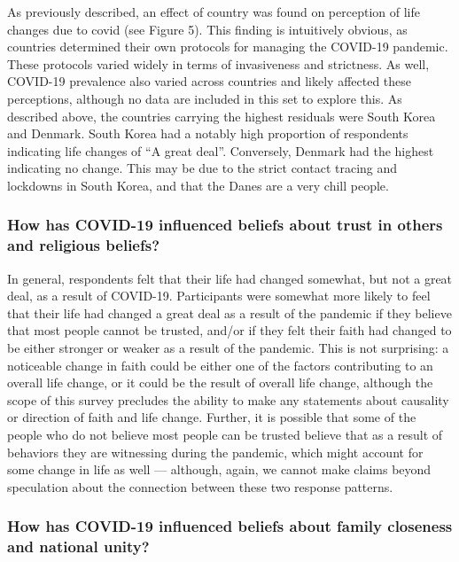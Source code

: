 \documentclass[
  english,
  man]{apa6}
\begin{document}
As previously described, an effect of country was found on perception of life changes due to covid (see Figure 5). This finding is intuitively obvious, as countries determined their own protocols for managing the COVID-19 pandemic. These protocols varied widely in terms of invasiveness and strictness. As well, COVID-19 prevalence also varied across countries and likely affected these perceptions, although no data are included in this set to explore this. As described above, the countries carrying the highest residuals were South Korea and Denmark. South Korea had a notably high proportion of respondents indicating life changes of \enquote{A great deal}. Conversely, Denmark had the highest indicating no change. This may be due to the strict contact tracing and lockdowns in South Korea, and that the Danes are a very chill people.

\hypertarget{how-has-covid-19-influenced-beliefs-about-trust-in-others-and-religious-beliefs}{%
\subsubsection{How has COVID-19 influenced beliefs about trust in others and religious beliefs?}\label{how-has-covid-19-influenced-beliefs-about-trust-in-others-and-religious-beliefs}}

In general, respondents felt that their life had changed somewhat, but not a great deal, as a result of COVID-19. Participants were somewhat more likely to feel that their life had changed a great deal as a result of the pandemic if they believe that most people cannot be trusted, and/or if they felt their faith had changed to be either stronger or weaker as a result of the pandemic. This is not surprising: a noticeable change in faith could be either one of the factors contributing to an overall life change, or it could be the result of overall life change, although the scope of this survey precludes the ability to make any statements about causality or direction of faith and life change. Further, it is possible that some of the people who do not believe most people can be trusted believe that as a result of behaviors they are witnessing during the pandemic, which might account for some change in life as well --- although, again, we cannot make claims beyond speculation about the connection between these two response patterns.

\hypertarget{how-has-covid-19-influenced-beliefs-about-family-closeness-and-national-unity}{%
\subsubsection{How has COVID-19 influenced beliefs about family closeness and national unity?}\label{how-has-covid-19-influenced-beliefs-about-family-closeness-and-national-unity}}
\end{document}
